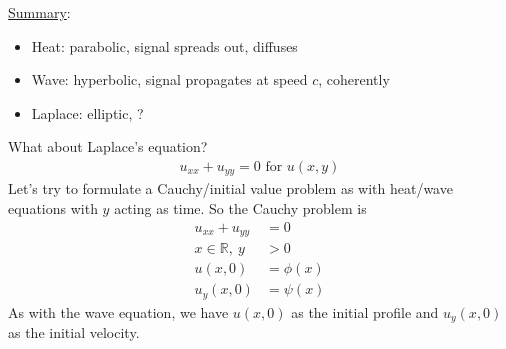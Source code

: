 \documentclass[12pt, letterpaper]{article}
\begin{document}
\underline{Summary}:
\begin{itemize}
    \item Heat: parabolic, signal spreads out, diffuses
    \item Wave: hyperbolic, signal propagates at speed $c$, coherently
    \item Laplace: elliptic, ?
\end{itemize}
What about Laplace's equation?
\begin{align*}
    u_{xx} + u_{yy} = 0 \text{ for } u(x,y)
\end{align*}
Let's try to formulate a Cauchy/initial value problem as with heat/wave equations with $y$ acting 
as time. So the Cauchy problem is 
\begin{align*}
    u_{xx} + u_{yy} &= 0\\
    x\in \mathbb{R},\ y &> 0\\
    u(x,0) &= \phi(x) \\
    u_y(x,0) &= \psi(x)
\end{align*}
As with the wave equation, we have $u(x,0)$ as the initial profile and $u_y(x,0)$ as the 
initial velocity.
\end{document}
